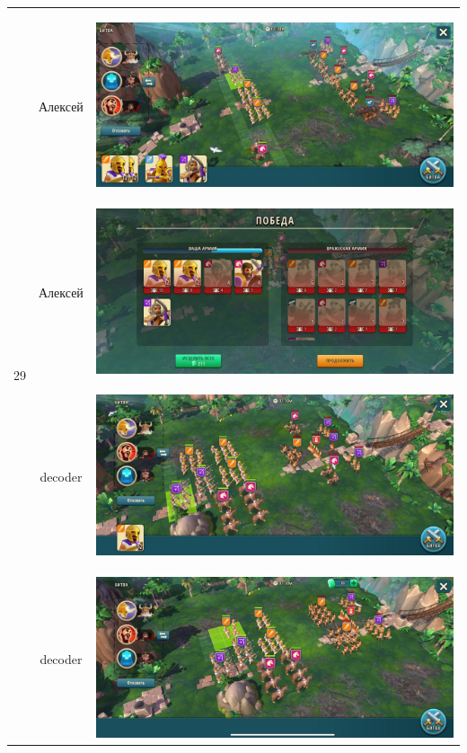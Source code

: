 \begin{longtable}{|c|c|c|}
    \hline
    \multirow{6}{*}{29} & Алексей &
    \hypertarget{fight29}{\includegraphics[width=0.75\linewidth]{./parts/media/TreasureHunt/29/alexey/photo_2022-04-07_13-18-00.jpg}} \\
    & Алексей &
    \includegraphics[width=0.75\linewidth]{./parts/media/TreasureHunt/29/alexey/photo_2022-04-07_13-17-44.jpg} \\
    \hline
    \multirow{10}{*}{30} & decoder &
    \hypertarget{fight30}{\includegraphics[width=0.75\linewidth]{./parts/media/TreasureHunt/30/decoder/photo_2022-04-07_09-59-28.jpg}} \\
    & decoder &
    \includegraphics[width=0.75\linewidth]{./parts/media/TreasureHunt/30/decoder/photo_2022-04-07_10-00-22.jpg} \\

\end{longtable}
